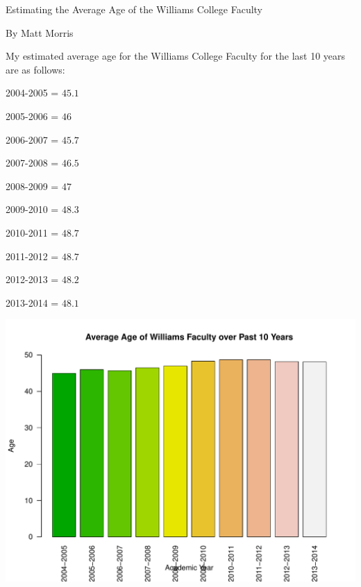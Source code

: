 \documentclass[12pt,a4paper]{article}\usepackage[]{graphicx}\usepackage[]{color}
\makeatletter
\def\maxwidth{ %
  \ifdim\Gin@nat@width>\linewidth
    \linewidth
  \else
    \Gin@nat@width
  \fi
}
\newenvironment{knitrout}{}{} %
\theoremstyle{definition}
\makeatother
\begin{document}
\thispagestyle{empty}
\centerline{\huge{Estimating the Average Age of the Williams College Faculty}}
\centerline{By Matt Morris}


















My estimated average age for the Williams College Faculty for the last 10 years are as follows:

\begin{center}

2004-2005 = \(45.1\)

2005-2006 = \(46\)

2006-2007 = \(45.7\)

2007-2008 = \(46.5\)

2008-2009 = \(47\)

2009-2010 = \(48.3\)

2010-2011 = \(48.7\)

2011-2012 = \(48.7\)

2012-2013 = \(48.2\)

2013-2014 = \(48.1\)

\end{center}


\begin{knitrout}
\color{fgcolor}
\includegraphics[width=\maxwidth]{figure/unnamed-chunk-6-1} 

\end{knitrout}
\end{document}
